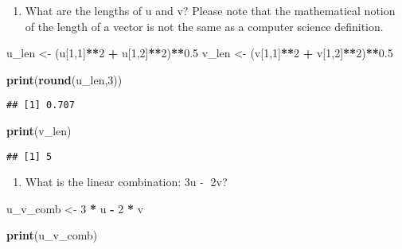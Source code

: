 \documentclass[
]{article}
\newenvironment{Shaded}{\begin{snugshade}}{\end{snugshade}}
\newcommand{\DecValTok}[1]{\textcolor[rgb]{0.00,0.00,0.81}{#1}}
\newcommand{\FloatTok}[1]{\textcolor[rgb]{0.00,0.00,0.81}{#1}}
\newcommand{\KeywordTok}[1]{\textcolor[rgb]{0.13,0.29,0.53}{\textbf{#1}}}
\newcommand{\NormalTok}[1]{#1}
\newcommand{\OperatorTok}[1]{\textcolor[rgb]{0.81,0.36,0.00}{\textbf{#1}}}
\newcommand{\StringTok}[1]{\textcolor[rgb]{0.31,0.60,0.02}{#1}}
\providecommand{\tightlist}{%
  \setlength{\itemsep}{0pt}\setlength{\parskip}{0pt}}
\begin{document}
\begin{enumerate}
\def\labelenumi{(\arabic{enumi})}
\setcounter{enumi}{1}
\tightlist
\item
  What are the lengths of u and v? Please note that the mathematical
  notion of the length of a vector is not the same as a computer science
  definition.
\end{enumerate}

\begin{Shaded}
\begin{Highlighting}[]
\NormalTok{u\_len \textless{}{-}}\StringTok{ }\NormalTok{(u[}\DecValTok{1}\NormalTok{,}\DecValTok{1}\NormalTok{]}\OperatorTok{**}\DecValTok{2} \OperatorTok{+}\StringTok{ }\NormalTok{u[}\DecValTok{1}\NormalTok{,}\DecValTok{2}\NormalTok{]}\OperatorTok{**}\DecValTok{2}\NormalTok{)}\OperatorTok{**}\FloatTok{0.5}
\NormalTok{v\_len \textless{}{-}}\StringTok{ }\NormalTok{(v[}\DecValTok{1}\NormalTok{,}\DecValTok{1}\NormalTok{]}\OperatorTok{**}\DecValTok{2} \OperatorTok{+}\StringTok{ }\NormalTok{v[}\DecValTok{1}\NormalTok{,}\DecValTok{2}\NormalTok{]}\OperatorTok{**}\DecValTok{2}\NormalTok{)}\OperatorTok{**}\FloatTok{0.5}

\KeywordTok{print}\NormalTok{(}\KeywordTok{round}\NormalTok{(u\_len,}\DecValTok{3}\NormalTok{))}
\end{Highlighting}
\end{Shaded}

\begin{verbatim}
## [1] 0.707
\end{verbatim}

\begin{Shaded}
\begin{Highlighting}[]
\KeywordTok{print}\NormalTok{(v\_len)}
\end{Highlighting}
\end{Shaded}

\begin{verbatim}
## [1] 5
\end{verbatim}

\begin{enumerate}
\def\labelenumi{(\arabic{enumi})}
\setcounter{enumi}{2}
\tightlist
\item
  What is the linear combination: 3u -􀀀 2v?
\end{enumerate}

\begin{Shaded}
\begin{Highlighting}[]
\NormalTok{u\_v\_comb \textless{}{-}}\StringTok{ }\DecValTok{3} \OperatorTok{*}\StringTok{ }\NormalTok{u }\OperatorTok{{-}}\StringTok{ }\DecValTok{2} \OperatorTok{*}\StringTok{ }\NormalTok{v}

\KeywordTok{print}\NormalTok{(u\_v\_comb)}
\end{Highlighting}
\end{Shaded}
\end{document}
